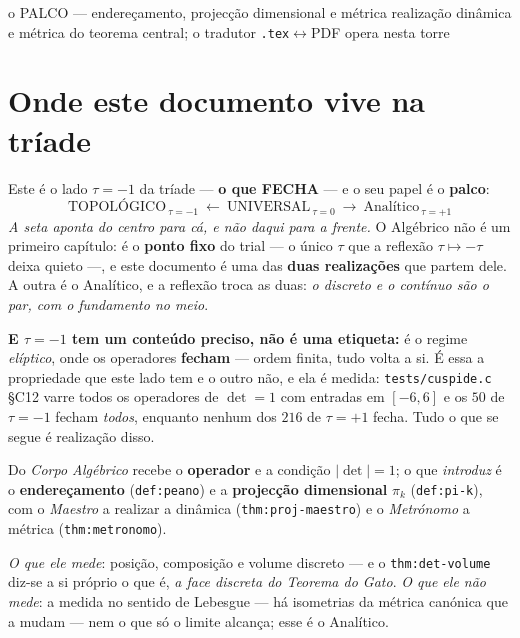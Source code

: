 \documentclass[11pt,a4paper]{article}
\newcommand{\code}[1]{\texttt{#1}}
\begin{document}
       {o PALCO --- endereçamento, projecção dimensional e métrica}
       {realização dinâmica e métrica do teorema central; o tradutor \texttt{.tex}$\leftrightarrow$PDF opera nesta torre}
\maketitle

\section*{Onde este documento vive na tríade}

Este é o lado $\tau=-1$ da tríade --- \textbf{o que FECHA} --- e o seu papel é o
\textbf{palco}:
\[
\boxed{\text{TOPOLÓGICO}}_{\ \tau=-1}\ \longleftarrow\ \text{UNIVERSAL}_{\ \tau=0}\
\longrightarrow\ \text{Analítico}_{\ \tau=+1}
\]
\emph{A seta aponta do centro para cá, e não daqui para a frente.} O Algébrico não é um
primeiro capítulo: é o \textbf{ponto fixo} do trial --- o único $\tau$ que a reflexão
$\tau\mapsto-\tau$ deixa quieto ---, e este documento é uma das \textbf{duas realizações}
que partem dele. A outra é o Analítico, e a reflexão troca as duas: \emph{o discreto e o
contínuo são o par, com o fundamento no meio}.

\textbf{E $\tau=-1$ tem um conteúdo preciso, não é uma etiqueta:} é o regime
\emph{elíptico}, onde os operadores \textbf{fecham} --- ordem finita, tudo volta a si. É
essa a propriedade que este lado tem e o outro não, e ela é medida:
\code{tests/cuspide.c} \S C12 varre todos os operadores de $\det=1$ com entradas em
$[-6,6]$ e os $50$ de $\tau=-1$ fecham \emph{todos}, enquanto nenhum dos $216$ de
$\tau=+1$ fecha. Tudo o que se segue é realização disso.

\smallskip
Do \emph{Corpo Algébrico} recebe o \textbf{operador} e a condição $\lvert\det\rvert=1$; o que
\emph{introduz} é o \textbf{endereçamento} (\code{def:peano}) e a \textbf{projecção
dimensional} $\pi_k$ (\code{def:pi-k}), com o \emph{Maestro} a realizar a dinâmica
(\code{thm:proj-maestro}) e o \emph{Metrónomo} a métrica (\code{thm:metronomo}).

\emph{O que ele mede}: posição, composição e volume discreto --- e o
\code{thm:det-volume} diz-se a si próprio o que é, \emph{a face discreta do Teorema do
Gato}. \emph{O que ele não mede}: a medida no sentido de Lebesgue --- há isometrias da
métrica canónica que a mudam --- nem o que só o limite alcança; esse é o Analítico.
\end{document}
